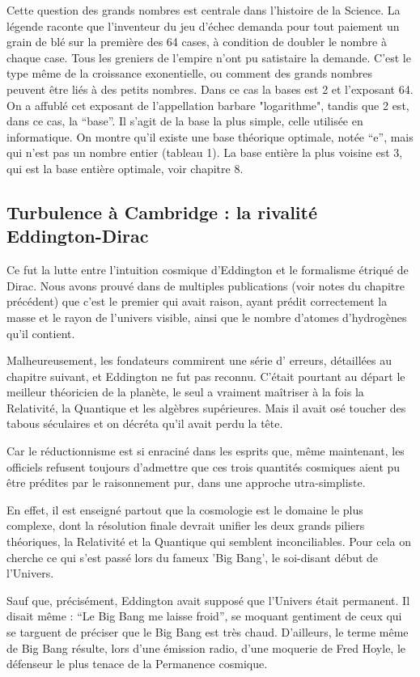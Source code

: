 \documentclass[a4paper,12pt]{article}
\begin{document}
Cette question des grands nombres est centrale dans l'histoire de la Science. La légende raconte que l'inventeur du jeu d'échec demanda pour tout paiement un grain de blé sur la première des 64 cases, à condition de doubler le nombre à chaque case. Tous les greniers de l'empire n'ont pu satistaire la demande. C'est le type m\^eme de la croissance exonentielle, ou comment des grands nombres peuvent être liés à des petits nombres. Dans ce cas la bases est 2 et l'exposant 64. On a affublé cet exposant de l'appellation barbare "logarithme", tandis que 2 est, dans ce cas, la ``base''. Il s'agit de la base la plus simple, celle utilisée en informatique. On montre qu'il existe une base théorique optimale, notée ``e'', mais qui n'est pas un nombre entier (tableau 1). La base entière la plus voisine est 3, qui est la base entière optimale, voir chapitre 8.    

\subsection{Turbulence à Cambridge : la rivalité Eddington-Dirac}
       Ce fut la lutte entre l'intuition cosmique d'Eddington et le formalisme étriqué de Dirac. Nous avons prouvé dans de multiples publications (voir notes du chapitre précédent) que c'est le premier qui avait raison, ayant prédit correctement la masse et le rayon de l'univers visible, ainsi que le nombre d'atomes d'hydrogènes qu'il contient. 

Malheureusement, les fondateurs commirent une série d' erreurs, détaillées au chapitre suivant, et Eddington ne fut pas reconnu. C'était pourtant au départ le meilleur théoricien de la planète, le seul a vraiment ma\^itriser à la fois la Relativité, la Quantique et les algèbres supérieures. Mais il avait osé toucher des tabous séculaires et on décréta qu'il avait perdu la tête.

Car le réductionnisme est si enraciné dans les esprits que, m\^eme maintenant, les officiels refusent toujours d'admettre que ces trois quantités cosmiques aient pu être prédites par le raisonnement pur, dans une approche utra-simpliste.

En effet, il est enseigné partout que la cosmologie est le domaine le plus complexe, dont la résolution finale devrait unifier les deux grands piliers théoriques, la Relativité et la Quantique qui semblent inconciliables. Pour cela on cherche ce qui s'est passé lors du fameux 'Big Bang', le soi-disant début de l'Univers.

Sauf que, précisément, Eddington avait supposé que l'Univers était permanent. Il disait même : ``Le Big Bang me laisse froid'', se moquant gentiment de ceux qui se targuent de préciser que le Big Bang est très chaud. D'ailleurs, le terme même de Big Bang résulte, lors d'une émission radio, d'une moquerie de Fred Hoyle, le défenseur le plus tenace de la Permanence cosmique.
\end{document}
